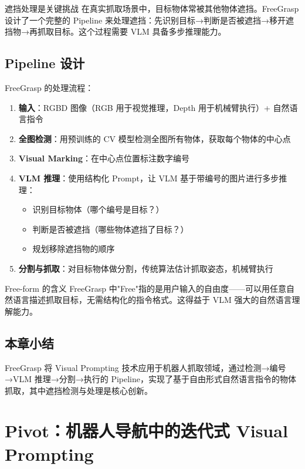 \documentclass[a4paper]{article}
\begin{document}
\begin{knowledgebox}{遮挡处理是关键挑战}
在真实抓取场景中，目标物体常被其他物体遮挡。FreeGrasp 设计了一个完整的 Pipeline 来处理遮挡：先识别目标→判断是否被遮挡→移开遮挡物→再抓取目标。这个过程需要 VLM 具备多步推理能力。
\end{knowledgebox}

\subsection{Pipeline 设计}

FreeGrasp 的处理流程：

\begin{enumerate}
    \item \textbf{输入}：RGBD 图像（RGB 用于视觉推理，Depth 用于机械臂执行）+ 自然语言指令
    \item \textbf{全图检测}：用预训练的 CV 模型检测全图所有物体，获取每个物体的中心点
    \item \textbf{Visual Marking}：在中心点位置标注数字编号
    \item \textbf{VLM 推理}：使用结构化 Prompt，让 VLM 基于带编号的图片进行多步推理：
    \begin{itemize}
        \item 识别目标物体（哪个编号是目标？）
        \item 判断是否被遮挡（哪些物体遮挡了目标？）
        \item 规划移除遮挡物的顺序
    \end{itemize}
    \item \textbf{分割与抓取}：对目标物体做分割，传统算法估计抓取姿态，机械臂执行
\end{enumerate}

\begin{importantbox}{Free-form 的含义}
FreeGrasp 中"Free"指的是用户输入的自由度——可以用任意自然语言描述抓取目标，无需结构化的指令格式。这得益于 VLM 强大的自然语言理解能力。
\end{importantbox}

\subsection{本章小结}

FreeGrasp 将 Visual Prompting 技术应用于机器人抓取领域，通过检测→编号→VLM 推理→分割→执行的 Pipeline，实现了基于自由形式自然语言指令的物体抓取，其中遮挡检测与处理是核心创新。


\section{Pivot：机器人导航中的迭代式 Visual Prompting}
\end{document}
